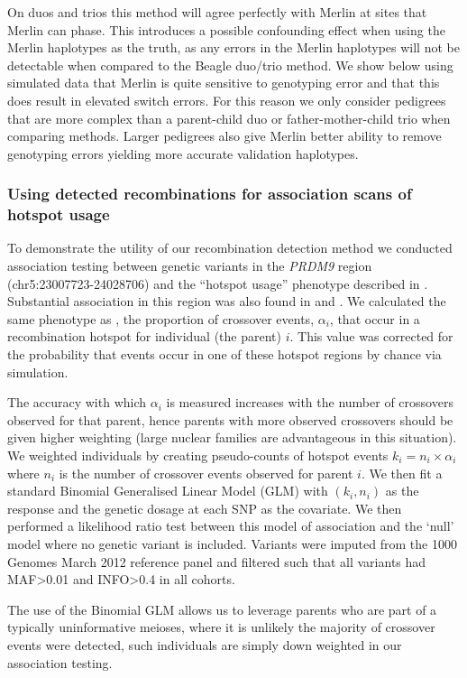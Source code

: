 On duos and trios this method will agree perfectly with  Merlin at sites that Merlin can phase. This introduces a possible confounding effect when using the Merlin haplotypes as the truth, as any errors in the Merlin haplotypes will not be detectable when compared to the Beagle duo/trio method. We show below using simulated data that Merlin is quite sensitive to genotyping error and that this does result in elevated switch errors. For this reason we only consider pedigrees that are more complex than a parent-child duo or father-mother-child trio when comparing methods. Larger pedigrees also give Merlin better ability to remove genotyping errors yielding more accurate validation haplotypes.


\subsubsection{Using detected recombinations for association scans of hotspot usage}
To demonstrate the utility of our recombination detection method we conducted association testing between genetic variants in the \emph{PRDM9} region (chr5:23007723-24028706)  and the ``hotspot usage'' phenotype described in \cite{coop2008high}.  Substantial association in this region was also found in \cite{kong2008detection} and \cite{hinch2011landscape}.  We calculated the same phenotype as \cite{coop2008high}, the proportion of crossover events, $\alpha_i$, that occur in a recombination hotspot for individual (the parent) $i$. This value was corrected for the probability that events occur in one of these hotspot regions by chance via simulation.  

The accuracy with which $\alpha_i$ is measured increases with the number of crossovers observed for that parent, hence parents with more observed crossovers should be given higher weighting (large nuclear families are advantageous in this situation).  We weighted individuals by creating pseudo-counts of hotspot events $k_i = n_i \times \alpha_i$ where $n_i$ is the number of crossover events observed for parent $i$.   We then fit a standard Binomial Generalised Linear Model (GLM) with $(k_i,n_i)$ as the response and the genetic dosage at each SNP as the covariate. We then performed a likelihood ratio test between this model of association and the `null' model where no genetic variant is included. Variants were imputed from the 1000 Genomes March 2012 reference panel and filtered such that all variants had MAF>0.01 and INFO>0.4 in all cohorts.

The use of the Binomial GLM allows us to leverage parents who are part of a typically uninformative meioses, where it is unlikely the majority of crossover events were detected, such individuals are simply down weighted in our association testing. 


